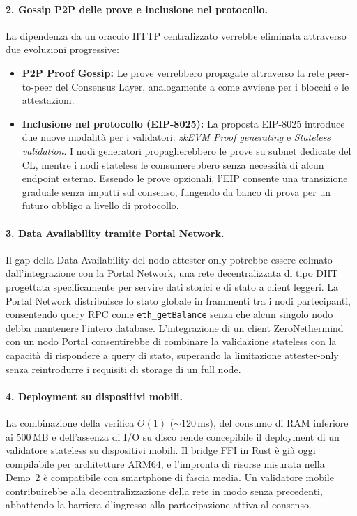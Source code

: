 \documentclass[12pt,a4paper,openright,twoside]{report}
\begin{document}
\paragraph{2. Gossip P2P delle prove e inclusione nel protocollo.}
La dipendenza da un oracolo HTTP centralizzato verrebbe eliminata attraverso due evoluzioni progressive:
\begin{itemize}
    \item \textbf{P2P Proof Gossip:} Le prove verrebbero propagate attraverso la rete peer-to-peer del Consensus Layer, analogamente a come avviene per i blocchi e le attestazioni.
    \item \textbf{Inclusione nel protocollo (EIP-8025):} La proposta EIP-8025\cite{eip8025} introduce due nuove modalità per i validatori: \textit{zkEVM Proof generating} e \textit{Stateless validation}. I nodi generatori propagherebbero le prove su subnet dedicate del CL, mentre i nodi stateless le consumerebbero senza necessità di alcun endpoint esterno. Essendo le prove opzionali, l'EIP consente una transizione graduale senza impatti sul consenso, fungendo da banco di prova per un futuro obbligo a livello di protocollo.
\end{itemize}

\paragraph{3. Data Availability tramite Portal Network.}
Il gap della Data Availability del nodo attester-only potrebbe essere colmato dall'integrazione con la Portal Network\cite{portal_network}, una rete decentralizzata di tipo DHT progettata specificamente per servire dati storici e di stato a client leggeri. La Portal Network distribuisce lo stato globale in frammenti tra i nodi partecipanti, consentendo query RPC come \texttt{eth\_getBalance} senza che alcun singolo nodo debba mantenere l'intero database. L'integrazione di un client ZeroNethermind con un nodo Portal consentirebbe di combinare la validazione stateless con la capacità di rispondere a query di stato, superando la limitazione attester-only senza reintrodurre i requisiti di storage di un full node.

\paragraph{4. Deployment su dispositivi mobili.}
La combinazione della verifica $O(1)$ ($\sim$120\,ms), del consumo di RAM inferiore ai 500\,MB e dell'assenza di I/O su disco rende concepibile il deployment di un validatore stateless su dispositivi mobili. Il bridge FFI in Rust è già oggi compilabile per architetture ARM64, e l'impronta di risorse misurata nella Demo~2 è compatibile con smartphone di fascia media. Un validatore mobile contribuirebbe alla decentralizzazione della rete in modo senza precedenti, abbattendo la barriera d'ingresso alla partecipazione attiva al consenso.
\end{document}
